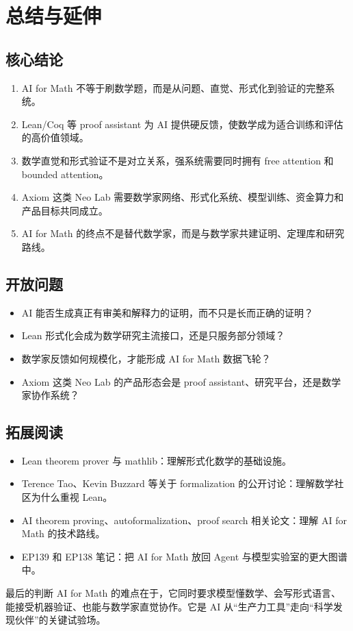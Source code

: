 \section{总结与延伸}

\subsection{核心结论}

\begin{enumerate}
\item AI for Math 不等于刷数学题，而是从问题、直觉、形式化到验证的完整系统。
\item Lean/Coq 等 proof assistant 为 AI 提供硬反馈，使数学成为适合训练和评估的高价值领域。
\item 数学直觉和形式验证不是对立关系，强系统需要同时拥有 free attention 和 bounded attention。
\item Axiom 这类 Neo Lab 需要数学家网络、形式化系统、模型训练、资金算力和产品目标共同成立。
\item AI for Math 的终点不是替代数学家，而是与数学家共建证明、定理库和研究路线。
\end{enumerate}

\subsection{开放问题}

\begin{itemize}
\item AI 能否生成真正有审美和解释力的证明，而不只是长而正确的证明？
\item Lean 形式化会成为数学研究主流接口，还是只服务部分领域？
\item 数学家反馈如何规模化，才能形成 AI for Math 数据飞轮？
\item Axiom 这类 Neo Lab 的产品形态会是 proof assistant、研究平台，还是数学家协作系统？
\end{itemize}

\subsection{拓展阅读}

\begin{itemize}
\item Lean theorem prover 与 mathlib：理解形式化数学的基础设施。
\item Terence Tao、Kevin Buzzard 等关于 formalization 的公开讨论：理解数学社区为什么重视 Lean。
\item AI theorem proving、autoformalization、proof search 相关论文：理解 AI for Math 的技术路线。
\item EP139 和 EP138 笔记：把 AI for Math 放回 Agent 与模型实验室的更大图谱中。
\end{itemize}

\begin{importantbox}{最后的判断}
AI for Math 的难点在于，它同时要求模型懂数学、会写形式语言、能接受机器验证、也能与数学家直觉协作。它是 AI 从“生产力工具”走向“科学发现伙伴”的关键试验场。
\end{importantbox}


